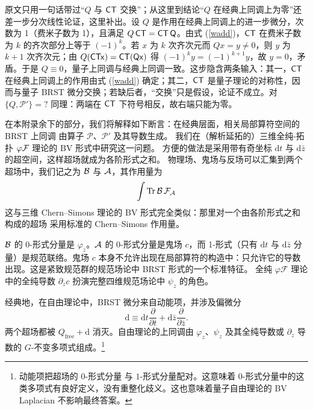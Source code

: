 \begin{yizhu}
原文只用一句话带过“$Q$ 与 $\sf C\sf T$ 交换”；从这里到结论“$Q$ 在经典上同调上为零”还差一步分次线性论证，这里补出。设 $Q$ 是作用在经典上同调上的进一步微分，次数为 1（费米子数为 1），且满足 $Q\,\sf C\sf T=\sf C\sf T\,Q$。由式 (\ref{wadd})，$\sf C\sf T$ 在费米子数为 $k$ 的齐次部分上等于 $(-1)^k$。若 $x$ 为 $k$ 次齐次元而 $Qx=y\ne 0$，则 $y$ 为 $k+1$ 次齐次元；由 $Q(\sf C\sf T x)=\sf C\sf T(Qx)$ 得 $(-1)^k y=(-1)^{k+1}y$，故 $y=0$，矛盾。于是 $Q\equiv 0$，量子上同调与经典上同调一致。这步隐含两条输入：其一，$\sf C\sf T$ 在经典上同调上的作用由式 (\ref{wadd}) 确定；其二，$\sf C\sf T$ 是量子理论的对称性，因而与量子 BRST 微分交换；若缺后者，“交换”只是假设，论证不成立。对 $\{Q,\mathcal P'\}=?$ 同理：两端在 $\sf C\sf T$ 下符号相反，故右端只能为零。
\end{yizhu}

在本附录余下的部分，我们将解释如下断言：在经典层面，相关局部算符空间的 BRST 上同调
由算子 $\mathcal P$、$\mathcal P'$ 及其导数生成。
我们在（解析延拓的）三维全纯-拓扑 $\varphi {\cal F}$ 理论的 BV 形式中研究这一问题。
方便的做法是采用带有奇坐标 ${\mathrm d} t$ 与 ${\mathrm d} \bar z$ 的超空间，这样超场就成为各阶形式之和。
物理场、鬼场与反场可以汇集到两个超场中，我们记之为 ${\cal B}$ 与 ${\cal A}$，其作用量为
\begin{equation}
\int \mathrm{Tr} \,{\cal B} \,{\cal F}_{\cal A}
\end{equation}
这与三维 Chern–Simons 理论的 BV 形式完全类似：那里对一个由各阶形式之和构成的超场
采用标准的 Chern–Simons 作用量。

${\cal B}$ 的 0-形式分量是 $\varphi_z$。${\cal A}$ 的 0-形式分量是鬼场 $c$，而 1-形式（只有 ${\mathrm d}t$ 与 ${\mathrm d} \bar z$ 分量）是规范联络。鬼场 $c$ 本身不允许出现在局部算符的构造中：只允许它的导数出现。这是紧致规范群的规范场论中 BRST 形式的一个标准特征。
全纯 $\varphi {\mathcal {F}}$ 理论中的全纯导数 $\partial_z c$ 扮演完整四维规范场论中 $\psi_z$ 的角色。

经典地，在自由理论中，BRST 微分来自动能项，并涉及偏微分
\begin{equation}
\mathrm{d} \equiv {\mathrm d}t \frac{\partial}{\partial t}+ {\mathrm d} \bar z \frac{\partial}{\partial \bar z}.
\end{equation}
两个超场都被 $Q_{\mathrm{free}} + \mathrm{d}$ 消灭。自由理论的上同调由
$\varphi_z$、$\psi_z$ 及其全纯导数或 $\partial_z$ 导数的 $G$-不变多项式组成。\footnote{动能项把超场的 $0$-形式分量
与 $1$-形式分量配对。这意味着 $0$-形式分量中的这类多项式有良好定义，没有重整化歧义。这也意味着量子自由理论的 BV Laplacian 不影响最终答案。}


